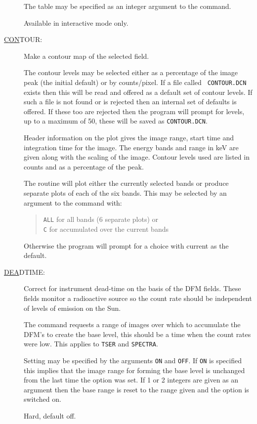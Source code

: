\begin{description}
The table may be specified as an integer argument to the command.

Available in interactive mode only.

\item[\underline{CON}TOUR: ] \label{con}
Make a contour map of the selected field.

The contour levels may be selected either as a percentage of the image
peak (the initial default) or by counts/pixel.  If a file called {\tt
CONTOUR.DCN} exists then this will be read and offered as a default set
of contour levels. If such a file is not found or is rejected then an
internal set of defaults is offered.  If these too are rejected then
the program will prompt for levels, up to a maximum of 50, these will
be saved as {\tt CONTOUR.DCN}.

Header information on the plot gives the image range, start time and
integration time for the image. The energy bands and range in keV are
given along with the scaling of the image. Contour levels used are
listed in counts and as a percentage of the peak.

The routine will plot either the currently selected bands or produce
separate plots of each of the six bands.  This may be selected by an
argument to the command with:
\begin{quote}
{\tt ALL} for all bands (6 separate plots) or\\ {\tt C} for accumulated
over the current bands
\end{quote}
Otherwise the program will prompt for a choice with current as the
default.

\item[\underline{DEA}DTIME: ] \label{dea}
Correct for instrument dead-time on the basis of the DFM fields. These
fields monitor a radioactive source so the count rate should be
independent of levels of emission on the Sun.

The command requests a range of images over which to accumulate the
DFM's to create the base level, this should be a time when the count
rates were low.  This applies to {\tt TSER} and {\tt SPECTRA}.

Setting may be specified by the arguments {\tt ON} and {\tt OFF}.  If
{\tt ON} is specified this implies that the image range for forming the
base level is unchanged from the last time the option was set. If 1 or
2 integers are given as an argument then the base range is reset to the
range given and the option is switched on.

Hard, default off.


\end{description}
